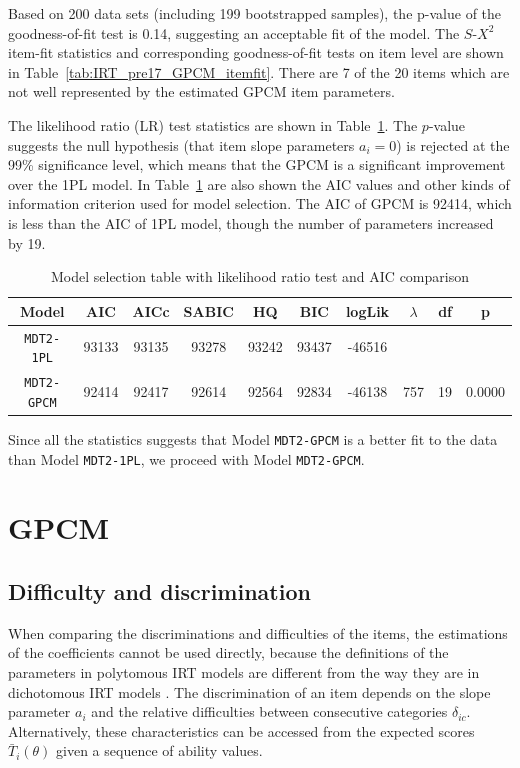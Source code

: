 \documentclass[a4paper]{report}
\begin{document}
Based on 200 data sets (including 199 bootstrapped samples), the p-value of the goodness-of-fit test is 0.14, suggesting an acceptable fit of the model. The $S\text{-}X^2$ item-fit statistics and corresponding goodness-of-fit tests on item level are shown in Table~\ref{tab:IRT_pre17_GPCM_itemfit}. There are 7 of the 20 items which are not well represented by the estimated GPCM item parameters. 

The likelihood ratio (LR) test statistics are shown in Table~\ref{tab:IRT_anova}. The $p$-value suggests the null hypothesis (that item slope parameters $a_i = 0$) is rejected at the 99\% significance level, which means that the GPCM is a significant improvement over the 1PL model. In Table~\ref{tab:IRT_anova} are also shown the AIC values and other kinds of information criterion used for model selection. The AIC of GPCM is 92414, which is less than the AIC of 1PL model, though the number of parameters increased by 19. 

\begin{table}[ht]
  \centering
  \begin{tabular}{cccccccccc}
    \hline
Model & AIC & AICc & SABIC & HQ & BIC & logLik & $\lambda$ & df & p \\ 
  \hline
\texttt{MDT2-1PL} & 93133 & 93135 & 93278 & 93242 & 93437 & -46516 &  &  &  \\ 
  \texttt{MDT2-GPCM} & 92414 & 92417 & 92614 & 92564 & 92834 & -46138 & 757 & 19 & 0.0000 \\ 
   \hline
  \end{tabular}
  \caption{\label{tab:IRT_anova}Model selection table with likelihood ratio test and AIC comparison}
\end{table}

Since all the statistics suggests that Model \texttt{MDT2-GPCM} is a better fit to the data than Model \texttt{MDT2-1PL}, we proceed with Model \texttt{MDT2-GPCM}. 

\section{GPCM}

\subsection{Difficulty and discrimination}

When comparing the discriminations and difficulties of the items, the estimations of the coefficients cannot be used directly, because the definitions of the parameters in polytomous IRT models are different from the way they are in dichotomous IRT models \cite{IRT}. The discrimination of an item depends on the slope parameter $a_i$ and the relative difficulties between consecutive categories $\delta_{ic}$. Alternatively, these characteristics can be accessed from the expected scores $\bar T_i(\theta)$ given a sequence of ability values. 
\end{document}
